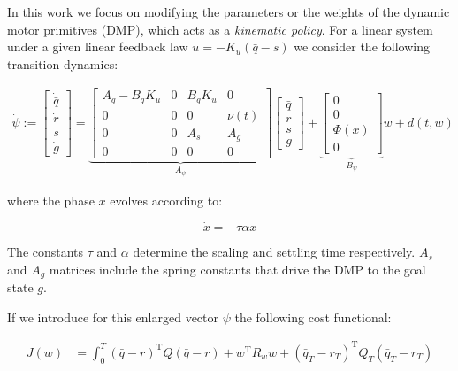 \documentclass[10pt,a4paper]{article}
\newcommand{\joint}{q} %
\newcommand{\state}{\bar{\joint}} %
\newcommand{\dmp}{s} %
\newcommand{\traj}{r} %
\newcommand{\linDist}{d} %
\newcommand{\sysInput}{u} %
\newcommand{\fullvec}{\psi} %
\newcommand{\phase}{x} %
\newcommand{\weights}{w} %
\newcommand{\basis}{\Phi} %
\begin{document}
In this work we focus on modifying the parameters or the weights of the dynamic motor primitives (DMP), which acts as a \emph{kinematic policy}. For a linear system under a given linear feedback law $\sysInput = -K_u(\state - \dmp)$ we consider the following transition dynamics:

\begin{equation}
\begin{aligned}
 \dot{\fullvec} := 
 \begin{bmatrix}
  \dot{\state} \\
  \dot{\traj} \\
  \dot{\dmp} \\
  \dot{g}
 \end{bmatrix} = 
 \underbrace{\begin{bmatrix}
  A_q - B_qK_u & 0 & B_qK_u & 0 \\
  0 & 0 & 0 & \nu(t) \\
  0  & 0  & A_s & A_g  \\
  0 & 0 & 0 & 0
 \end{bmatrix}}_{A_{\fullvec}}
 \begin{bmatrix}
   \state \\
   \traj \\
   \dmp \\
   g
  \end{bmatrix} +
  \underbrace{\begin{bmatrix}
    0 \\
    0 \\
    \basis(\phase) \\
    0
   \end{bmatrix}}_{B_{\fullvec}} \weights + \linDist(t,\weights)
\end{aligned}
\label{fullTransition}
\end{equation}

where the phase $\phase$ evolves according to:

\begin{equation}
\dot{\phase} = -\tau\alpha\phase
\label{phase}
\end{equation}

The constants $\tau$ and $\alpha$ determine the scaling and settling time respectively. $A_s$ and $A_g$ matrices include the spring constants that drive the DMP to the goal state $g$.

If we introduce for this enlarged vector $\fullvec$ the following cost functional:

\begin{equation}
\begin{aligned}
J(\weights) &= \int_{0}^{T} (\state - \traj)^{\mathrm{T}}Q(\state - \traj) + \weights^{\mathrm{T}}R_w\weights + (\state_T-\traj_T)^{\mathrm{T}}Q_{T}(\state_T-\traj_T) 
\end{aligned}
\label{cost2}
\end{equation}
\end{document}
